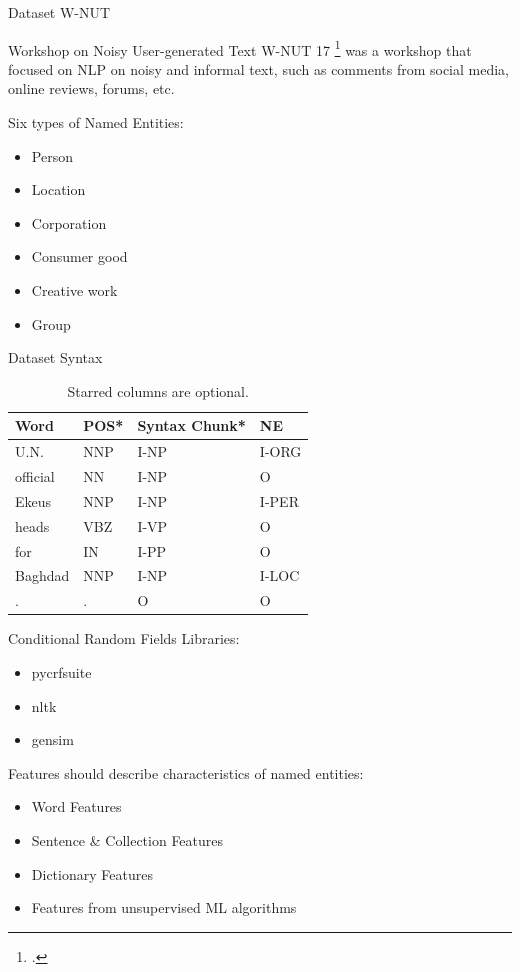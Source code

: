 \documentclass[12pt, tikz]{beamer}
\begin{document}
\begin{frame}[fragile]{Dataset W-NUT}
	
	\begin{block}{Workshop on Noisy User-generated Text}
		W-NUT 17 \footcite{derczynski2017results} was a workshop that focused on NLP on noisy and informal text, such as comments from social media, online reviews, forums, etc.
	\end{block}
	\pause
	Six types of Named Entities:
	\begin{itemize}
		\item Person
		\item Location
		\item Corporation
		\item Consumer good
		\item Creative work
		\item Group 
	\end{itemize}
	
\end{frame}

\begin{frame}[fragile]{Dataset Syntax}
	\begin{center}
		\begin{table}
		\begin{tabular}{l | l | l | l}
			Word & POS* & Syntax Chunk* & NE \\
			\hline
			U.N. & NNP & I-NP & I-ORG 
\\
			official & NN & I-NP & O 
\\
			Ekeus & NNP & I-NP & I-PER \\ 
			heads & VBZ & I-VP & O 
\\
			for & IN & I-PP & O \\
			Baghdad & NNP & I-NP & I-LOC \\ 
			. & . & O & O \\
		\end{tabular}
		\caption{Starred columns are optional.}
		\end{table}
	\end{center}
\end{frame}

\begin{frame}[fragile]{Conditional Random Fields}
	Libraries:
	\begin{itemize}
		\item pycrfsuite
		\item nltk
		\item gensim
	\end{itemize}
	\pause
	
	Features should describe characteristics of named entities:
	\begin{itemize}
		\item<2-> Word Features
		\item<3-> Sentence \& Collection Features
		\item<4-> Dictionary Features
		\item<5-> Features from unsupervised ML algorithms
	\end{itemize}
\end{frame}
\end{document}
